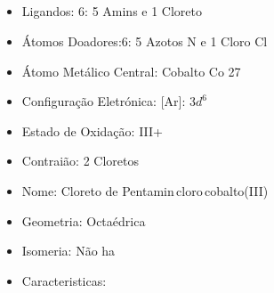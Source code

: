 \documentclass[12pt]{article}
\begin{document}
	\subsection{}
	\begin{itemize}
   
   
   \item Ligandos: 6:
   	5 Amins  e 1 Cloreto 
   
   
   \item Átomos Doadores:6:
   	5 Azotos N e 1 Cloro Cl
   
   \item Átomo Metálico Central: Cobalto Co 27
   
   \item Configuração Eletrónica: [Ar]: $ 3d^6 $
   
   \item Estado de Oxidação: III+
   
   \item Contraião: 2 Cloretos 
   
   \item Nome: Cloreto de Pentamin\,cloro\,cobalto(III)
   
   \item Geometria: Octaédrica
   
   \item Isomeria: Não ha

	\item Caracteristicas:

	\end{itemize}
	
\break


	
\end{document}
